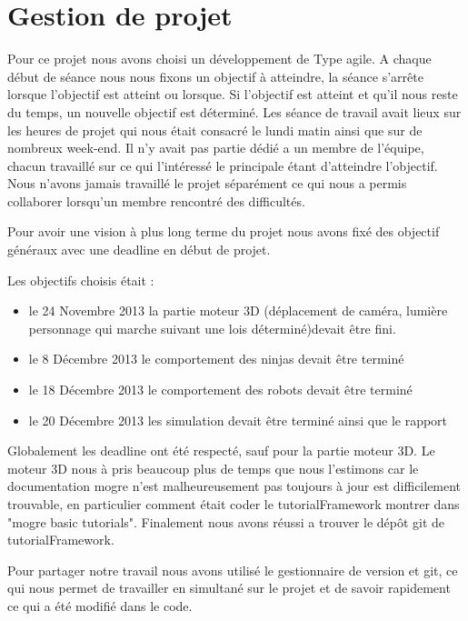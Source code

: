 \section{Gestion de projet}
\thispagestyle{fancy}
Pour ce projet nous avons choisi un développement de Type agile. A chaque début de séance nous nous fixons un objectif à atteindre, la séance s'arrête lorsque l'objectif est atteint ou lorsque. Si l'objectif est atteint et qu'il nous reste du temps, un nouvelle objectif est déterminé. Les séance de travail avait lieux sur les heures de projet qui nous était consacré le lundi matin ainsi que sur de nombreux week-end. Il n'y avait pas partie dédié a un membre de l'équipe, chacun travaillé sur ce qui l'intéressé le principale étant d'atteindre l'objectif. Nous n'avons jamais travaillé le projet séparément ce qui nous a permis collaborer lorsqu'un membre rencontré des difficultés.

Pour avoir une vision à plus long terme du projet nous avons fixé des objectif généraux avec une deadline en début de projet. 

\noindent Les objectifs choisis était :
\begin{itemize}
\item le 24 Novembre 2013 la partie moteur 3D (déplacement de caméra, lumière personnage qui marche suivant une lois déterminé)devait être fini.
\item le 8 Décembre 2013 le comportement des ninjas devait être terminé
\item le 18 Décembre 2013 le comportement des robots devait être terminé
\item le 20 Décembre 2013 les simulation devait être terminé ainsi que le rapport
\end{itemize}

Globalement les deadline ont été respecté, sauf pour la partie moteur 3D. Le moteur 3D nous à pris beaucoup plus de temps que nous l'estimons car le documentation mogre n'est malheureusement pas toujours à jour est difficilement trouvable, en particulier comment était coder le tutorialFramework montrer dans "mogre basic tutorials". Finalement nous avons réussi a trouver le dépôt git de tutorialFramework.

Pour partager notre travail nous avons utilisé le gestionnaire de version et git, ce qui nous permet de travailler en simultané sur le projet et de savoir rapidement ce qui a été modifié dans le code. 

  
